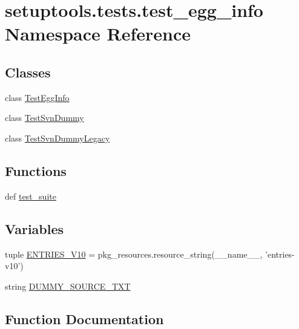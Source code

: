 \hypertarget{namespacesetuptools_1_1tests_1_1test__egg__info}{}\section{setuptools.\+tests.\+test\+\_\+egg\+\_\+info Namespace Reference}
\label{namespacesetuptools_1_1tests_1_1test__egg__info}
\subsection*{Classes}
\begin{DoxyCompactItemize}
\item 
class \hyperlink{classsetuptools_1_1tests_1_1test__egg__info_1_1TestEggInfo}{Test\+Egg\+Info}
\item 
class \hyperlink{classsetuptools_1_1tests_1_1test__egg__info_1_1TestSvnDummy}{Test\+Svn\+Dummy}
\item 
class \hyperlink{classsetuptools_1_1tests_1_1test__egg__info_1_1TestSvnDummyLegacy}{Test\+Svn\+Dummy\+Legacy}
\end{DoxyCompactItemize}
\subsection*{Functions}
\begin{DoxyCompactItemize}
\item 
def \hyperlink{namespacesetuptools_1_1tests_1_1test__egg__info_ab558bb1e398d93ee4f593f155b141d4a}{test\+\_\+suite}
\end{DoxyCompactItemize}
\subsection*{Variables}
\begin{DoxyCompactItemize}
\item 
tuple \hyperlink{namespacesetuptools_1_1tests_1_1test__egg__info_ab3cb7d6983d3b90831a70566c756d64a}{E\+N\+T\+R\+I\+E\+S\+\_\+\+V10} = pkg\+\_\+resources.\+resource\+\_\+string(\+\_\+\+\_\+name\+\_\+\+\_\+, 'entries-\/v10')
\item 
string \hyperlink{namespacesetuptools_1_1tests_1_1test__egg__info_adaa5f353687a9f3affca6fb45a911e43}{D\+U\+M\+M\+Y\+\_\+\+S\+O\+U\+R\+C\+E\+\_\+\+T\+X\+T}
\end{DoxyCompactItemize}


\subsection{Function Documentation}
\hypertarget{namespacesetuptools_1_1tests_1_1test__egg__info_ab558bb1e398d93ee4f593f155b141d4a}{}
